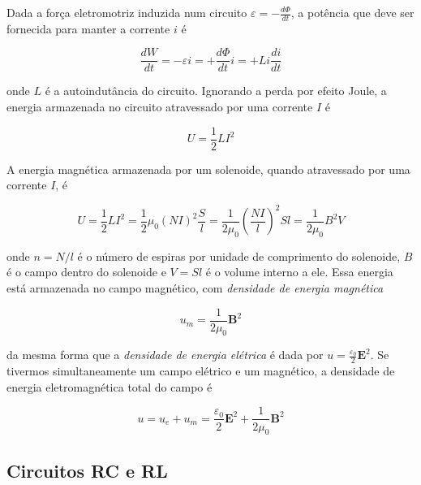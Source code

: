 \documentclass[12pt]{article}
\begin{document}
Dada a força eletromotriz induzida num circuito \(\displaystyle \varepsilon = - \frac{d\Phi}{dt}\), a potência que deve ser fornecida para manter a corrente \(i\) é

\begin{equation}
    \frac{dW}{dt} = - \varepsilon i = + \frac{d\Phi}{dt} i = + Li \frac{di}{dt}
\end{equation}

\noindent onde \(L\) é a autoindutância do circuito. Ignorando a perda por efeito Joule, a energia armazenada no circuito atravessado por uma corrente \(I\) é

\begin{equation}
    \boxed{U = \frac{1}{2} L I^2}
\end{equation}

A energia magnética armazenada por um solenoide, quando atravessado por uma corrente \(I\), é

\begin{equation}
    U = \frac{1}{2} L I^2 = \frac{1}{2}\mu_0 \left(NI\right)^2 \frac{S}{l} = \frac{1}{2\mu_0} \left(\frac{NI}{l}\right)^2 Sl = \frac{1}{2\mu_0} B^2 V
\end{equation}

\noindent onde \(n = N/l\) é o número de espiras por unidade de comprimento do solenoide, \(B\) é o campo dentro do solenoide e \(V = Sl\) é o volume interno a ele. Essa energia está armazenada no campo magnético, com \emph{densidade de energia magnética}

\begin{equation}
    \boxed{u_m = \frac{1}{2\mu_0}\mathbf{B}^2}
\end{equation}

\noindent da mesma forma que a \emph{densidade de energia elétrica} é dada por \(\displaystyle u = \frac{\varepsilon_0}{2}\mathbf{E}^2\). Se tivermos simultaneamente um campo elétrico e um magnético, a densidade de energia eletromagnética total do campo é

\begin{equation}
    \boxed{u = u_e + u_m = \frac{\varepsilon_0}{2}\mathbf{E}^2 + \frac{1}{2\mu_0} \mathbf{B}^2}
\end{equation}

\subsection{Circuitos RC e RL}
\end{document}
